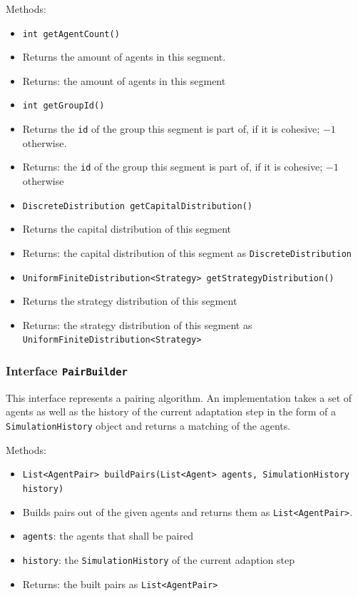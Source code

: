 \documentclass[parskip=full,11pt]{scrartcl}
\begin{document}
Methods:
\begin{itemize}\itemsep -10pt
\item \texttt{int getAgentCount()}
\item[] Returns the amount of agents in this segment.
\item[] Returns: the amount of agents in this segment

\item \texttt{int getGroupId()}
\item[] Returns the \texttt{id} of the group this segment is part of, if it is cohesive; \(-1\) otherwise.
\item[] Returns: the \texttt{id} of the group this segment is part of, if it is cohesive; \(-1\) otherwise

\item \texttt{DiscreteDistribution getCapitalDistribution()}
\item[] Returns the capital distribution of this segment
\item[] Returns: the capital distribution of this segment as \texttt{DiscreteDistribution}

\item \texttt{UniformFiniteDistribution<Strategy> getStrategyDistribution()}
\item[] Returns the strategy distribution of this segment
\item[] Returns: the strategy distribution of this segment as \texttt{UniformFiniteDistribution<Strategy>}
\end{itemize}

\subsubsection{Interface \texttt{PairBuilder}}
This interface represents a pairing algorithm. An implementation takes a set of agents as well as the history of the current adaptation step in the form of a \texttt{SimulationHistory} object and returns a matching of the agents.

Methods:
\begin{itemize}\itemsep -10pt
\item \texttt{List<AgentPair> buildPairs(List<Agent> agents, SimulationHistory history)}
\item[] Builds pairs out of the given agents and returns them as \texttt{List<AgentPair>}.
\item[] \texttt{agents}: the agents that shall be paired
\item[] \texttt{history}: the \texttt{SimulationHistory} of the current adaption step
\item[] Returns: the built pairs as \texttt{List<AgentPair>}
\end{itemize}
\end{document}
